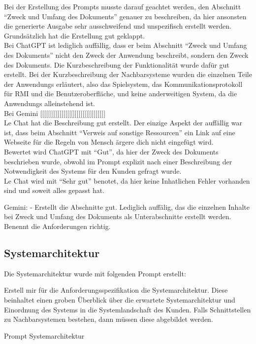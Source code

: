 Bei der Erstellung des Prompts musste darauf geachtet werden, den Abschnitt ``Zweck und Umfang des Dokuments'' genauer zu beschreiben, da hier ansonsten
die generierte Ausgabe sehr ausschweifend und unspezifisch erstellt werden. Grundsätzlich hat die Erstellung gut geklappt.\\
Bei ChatGPT ist lediglich auffällig, dass er beim Abschnitt ``Zweck und Umfang des Dokuments'' nicht den Zweck der Anwendung beschreibt, sondern den Zweck 
des Dokuments. Die Kurzbeschreibung der Funktionalität wurde dafür gut erstellt. Bei der Kurzbeschreibung der Nachbarsysteme wurden die einzelnen Teile 
der Anwendungs erläutert, also das Spielsystem, das Kommunikationsprotokoll für RMI und die Benutzeroberfläche, und keine anderweitigen System, da die 
Anwendungs alleinstehend ist.\\
Bei Gemini [[[[[[[[[[[[[[[[[]]]]]]]]]]]]]]]]]\\
Le Chat hat die Beschreibung gut erstellt. Der einzige Aspekt der auffällig war ist, dass beim Abschnitt ``Verweis auf sonstige Ressourcen'' ein Link 
auf eine Webseite für die Regeln von Mensch ärgere dich nicht eingefügt wird.\\

Bewertet wird ChatGPT mit ``Gut'', da hier der Zweck des Dokuments beschrieben wurde, obwohl im Prompt explizit nach einer Beschreibung der Notwendigkeit
des Systems für den Kunden gefragt wurde.\\
Le Chat wird mit ``Sehr gut'' benotet, da hier keine Inhatlichen Fehler vorhanden sind und soweit alles gepasst hat. 


Gemini: 
    - Erstellt die Abschnitte gut. Lediglich auffälig, das die einzelnen Inhalte bei Zweck und Umfang des Dokuments als Unterabschnitte 
    erstellt werden. Benennt die Anforderungen richtig.

\subsection*{Systemarchitektur}

Die Systemarchitektur wurde mit folgenden Prompt erstellt:

\begin{prompt}[H]
    \begin{tcolorbox}[colback=gray!20, colframe=gray!20, boxrule=0pt, sharp corners] 
        Erstell mir für die Anforderungsspezifikation die Systemarchitektur. Diese beinhaltet einen groben Überblick über die erwartete Systemarchitektur 
        und Einordnung des Systems in die Systemlandschaft des Kunden. Falls Schnittstellen zu Nachbarsystemen bestehen, dann müssen diese abgebildet werden.
        \vfill
    \end{tcolorbox}
    \caption{Prompt Systemarchitektur}
    \label{Prompt Systemarchitektur}
\end{prompt}

